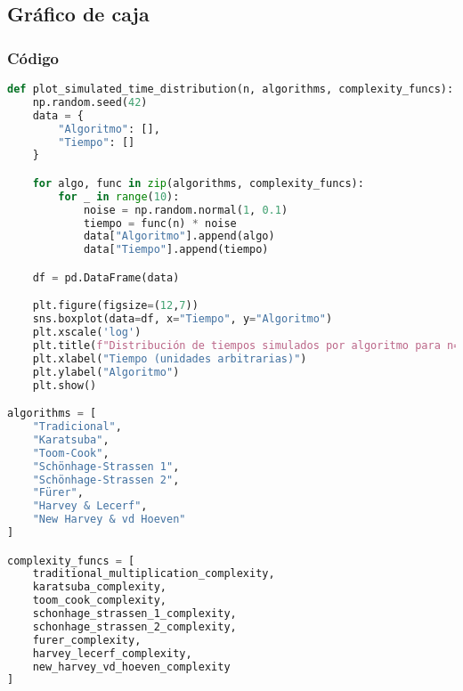 \subsection{Gráfico de caja}

\subsubsection{Código}
\begin{lstlisting}[language=Python, caption={Codigo grafico de caja en Python}, label=list:python_code_ex]
def plot_simulated_time_distribution(n, algorithms, complexity_funcs):
    np.random.seed(42)
    data = {
        "Algoritmo": [],
        "Tiempo": []
    }

    for algo, func in zip(algorithms, complexity_funcs):
        for _ in range(10):
            noise = np.random.normal(1, 0.1)
            tiempo = func(n) * noise
            data["Algoritmo"].append(algo)
            data["Tiempo"].append(tiempo)

    df = pd.DataFrame(data)

    plt.figure(figsize=(12,7))
    sns.boxplot(data=df, x="Tiempo", y="Algoritmo")
    plt.xscale('log')
    plt.title(f"Distribución de tiempos simulados por algoritmo para n={n}")
    plt.xlabel("Tiempo (unidades arbitrarias)")
    plt.ylabel("Algoritmo")
    plt.show()

algorithms = [
    "Tradicional",
    "Karatsuba",
    "Toom-Cook",
    "Schönhage-Strassen 1",
    "Schönhage-Strassen 2",
    "Fürer",
    "Harvey & Lecerf",
    "New Harvey & vd Hoeven"
]

complexity_funcs = [
    traditional_multiplication_complexity,
    karatsuba_complexity,
    toom_cook_complexity,
    schonhage_strassen_1_complexity,
    schonhage_strassen_2_complexity,
    furer_complexity,
    harvey_lecerf_complexity,
    new_harvey_vd_hoeven_complexity
]
\end{lstlisting}

